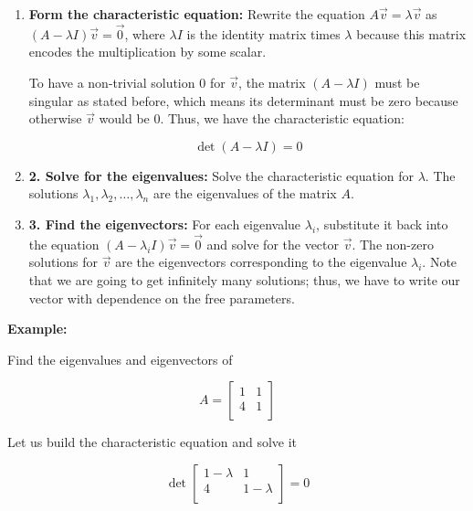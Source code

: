 \begin{enumerate}

    \item \textbf{Form the characteristic equation:} Rewrite the equation \(A\vec{v} = \lambda\vec{v}\) as 
    \((A - \lambda I)\vec{v} = \vec{0}\), where \(\lambda I\) is the identity matrix times \(\lambda\) because 
    this matrix encodes the multiplication by some scalar. 
        
    To have a non-trivial solution \(0\) for \(\vec{v}\), the matrix \((A - \lambda I)\) must be 
    singular as stated before, which means its determinant must be zero because otherwise \(\vec{v}\) 
    would be 0. Thus, we have the characteristic equation:

    \[
        \det(A - \lambda I) = 0
    \]

    \item \textbf{2. Solve for the eigenvalues:} Solve the characteristic equation for \(\lambda\). The solutions 
    \(\lambda_1, \lambda_2, \dots, \lambda_n\) are the eigenvalues of the matrix \(A\).

    \item \textbf{3. Find the eigenvectors:} For each eigenvalue \(\lambda_i\), substitute it back into the equation 
    \((A - \lambda_i I)\vec{v} = \vec{0}\) and solve for the vector \(\vec{v}\). The non-zero 
    solutions for \(\vec{v}\) are the eigenvectors corresponding to the eigenvalue 
    \(\lambda_i\). Note that we are going to get infinitely many solutions; thus, we have to write 
    our vector with dependence on the free 
    parameters.

\end{enumerate}

\textbf{Example:}

Find the eigenvalues and eigenvectors of 

\[
    A = \begin{bmatrix}
        1 & 1 \\
        4 & 1 \\
    \end{bmatrix}
\]

Let us build the characteristic equation and solve it

\[
    \det 
    \begin{bmatrix}
        1 - \lambda & 1 \\
        4 & 1 - \lambda \\
    \end{bmatrix}
    = 0
\]

